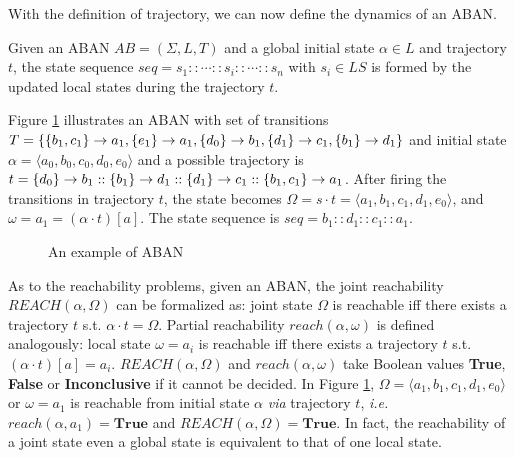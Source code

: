 With the definition of trajectory, we can now define the dynamics of an ABAN.

\begin{definition}
Given an ABAN $AB = (\Sigma,L,T)$ and a global initial state $\alpha\in L$ and trajectory $t$, the state sequence $seq=s_1::\cdots :: s_i::\cdots ::s_n$ with $s_i\in LS$ is formed by the updated local states during the trajectory $t$.
\end{definition}

\begin{example}
    Figure \ref{exampleABAN} illustrates an ABAN with set of transitions $T=\{\acm{b_1,c_1}{a_0}{a_1},\acm{e_1}{a_0}{a_1},\acm{d_0}{b_0}{b_1},\acm{d_1}{c_0}{c_1},\acm{b_1}{d_0}{d_1}\}$ and initial state $\alpha=\langle a_0,b_0,c_0,d_0,e_0\rangle$ and a possible trajectory is $t=\acm{d_0}{b_0}{b_1}::\acm{b_1}{d_0}{d_1}::\acm{d_1}{c_0}{c_1}::\acm{b_1,c_1}{a_0}{a_1}$.
    After firing the transitions in trajectory $t$, the state becomes $\Omega=s\cdot t=\langle a_1,b_1,c_1,d_1,e_0\rangle$, and $\omega= a_1= (\alpha\cdot t)[a]$. The state sequence is $seq=b_1::d_1::c_1::a_1$.
\end{example}

\begin{figure}[ht]
\centering

\caption[Example of ABAN]{An example of ABAN}\label{exampleABAN}
\end{figure}

As to the reachability problems, given an ABAN, the joint reachability $REACH (\alpha,\Omega)$ can be formalized as: joint state $\Omega$ is reachable iff there exists a trajectory $t$ s.t. $\alpha\cdot t=\Omega$.
Partial reachability $reach(\alpha,\omega)$ is defined analogously: local state $\omega=a_i$ is reachable iff there exists a trajectory $t$ s.t. $(\alpha\cdot t)[a]=a_i$.
$REACH (\alpha,\Omega)$ and $reach(\alpha,\omega)$ take Boolean values \textbf{True}, \textbf{False} or \textbf{Inconclusive} if it cannot be decided.
In Figure \ref{exampleABAN}, $\Omega=\langle a_1,b_1,c_1,d_1,e_0\rangle$ or $\omega=a_1$ is reachable from initial state $\alpha$ \textit{via} trajectory $t$, \textit{i.e.} $reach(\alpha,a_1)=\textbf{True}$ and $REACH(\alpha,\Omega)=\textbf{True}$. 
In fact, the reachability of a joint state even a global state is equivalent to that of one local state. 

